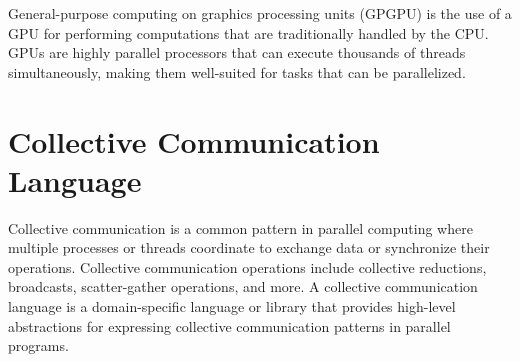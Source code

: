 General-purpose computing on graphics processing units (GPGPU) is the
use of a GPU for performing computations that are traditionally
handled by the CPU. GPUs are highly parallel processors that can
execute thousands of threads simultaneously, making them well-suited
for tasks that can be parallelized.


\section {Collective Communication Language}

Collective communication is a common pattern in parallel computing
where multiple processes or threads coordinate to exchange data or
synchronize their operations. Collective communication operations
include collective reductions, broadcasts, scatter-gather operations,
and more. A collective communication language is a domain-specific
language or library that provides high-level abstractions for
expressing collective communication patterns in parallel programs.








